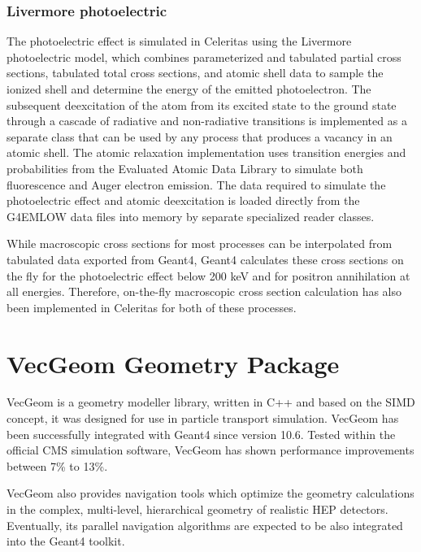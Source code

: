 \documentclass{webofc}
\begin{document}
\subsubsection{Livermore photoelectric}

The photoelectric effect is simulated in Celeritas using the Livermore
photoelectric model, which combines parameterized and tabulated partial cross
sections, tabulated total cross sections, and atomic shell data to sample the
ionized shell and determine the energy of the emitted photoelectron. The
subsequent deexcitation of the atom from its excited state to the ground state
through a cascade of radiative and non-radiative transitions is implemented as
a separate class that can be used by any process that produces a vacancy in an
atomic shell. The atomic relaxation implementation uses transition energies and
probabilities from the Evaluated Atomic Data Library to simulate both
fluorescence and Auger electron emission. The data required to simulate the
photoelectric effect and atomic deexcitation is loaded directly from the
G4EMLOW data files into memory by separate specialized reader classes.

While macroscopic cross sections for most processes can be interpolated from
tabulated data exported from Geant4, Geant4 calculates these cross sections on
the fly for the photoelectric effect below 200 keV and for positron
annihilation at all energies. Therefore, on-the-fly macroscopic cross section
calculation has also been implemented in Celeritas for both of these processes.

\section{VecGeom Geometry Package}
\label{sec:vecgeom}

\hspace*{0.35cm} VecGeom is a geometry modeller library, written in C++ and based on the SIMD concept, it 
was designed for use in particle transport simulation\cite{VecGeom21}. VecGeom has been 
successfully integrated with Geant4 since version 10.6. Tested within the official CMS 
simulation software, VecGeom has shown performance improvements between 7\% to 13\%\cite{Pedro:2019mkq}.

VecGeom also provides navigation tools which optimize the geometry calculations in the complex,
multi-level, hierarchical geometry of realistic HEP detectors\cite{Wenzel:2020zyn}. Eventually, its 
parallel navigation algorithms are expected to be also integrated into the Geant4 toolkit.
\end{document}

